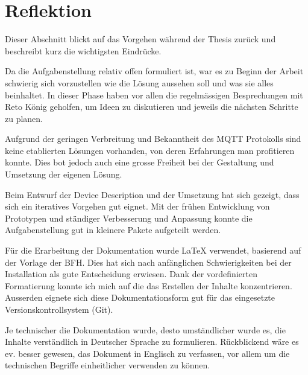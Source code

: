 \section{Reflektion}

Dieser Abschnitt blickt auf das Vorgehen während der Thesis zurück und beschreibt kurz die wichtigsten Eindrücke.

Da die Aufgabenstellung relativ offen formuliert ist, war es zu Beginn der Arbeit schwierig sich vorzustellen wie die Lösung aussehen soll und was sie alles beinhaltet. In dieser Phase haben vor allen die regelmässigen Besprechungen mit Reto König geholfen, um Ideen zu diskutieren und jeweils die nächsten Schritte zu planen.

Aufgrund der geringen Verbreitung und Bekanntheit des MQTT Protokolls sind keine etablierten Lösungen vorhanden, von deren Erfahrungen man profitieren konnte. Dies bot jedoch auch eine grosse Freiheit bei der Gestaltung und Umsetzung der eigenen Lösung.

Beim Entwurf der Device Description und der Umsetzung hat sich gezeigt, dass sich ein iteratives Vorgehen   gut eignet. Mit der frühen Entwicklung von Prototypen und ständiger Verbesserung und Anpassung konnte die Aufgabenstellung gut in kleinere Pakete aufgeteilt werden.


Für die Erarbeitung der Dokumentation wurde LaTeX verwendet, basierend auf der Vorlage der BFH. Dies hat sich nach anfänglichen Schwierigkeiten bei der Installation als gute Entscheidung erwiesen. Dank der vordefinierten Formatierung konnte ich mich auf die das Erstellen der Inhalte konzentrieren. Ausserden eignete sich diese Dokumentationsform gut für das eingesetzte Versionskontrollsystem (Git).

Je technischer die Dokumentation wurde, desto umständlicher wurde es, die Inhalte verständlich in Deutscher Sprache zu formulieren. Rückblickend wäre es ev. besser gewesen, das Dokument in Englisch zu verfassen, vor allem um die technischen Begriffe einheitlicher verwenden zu können.
